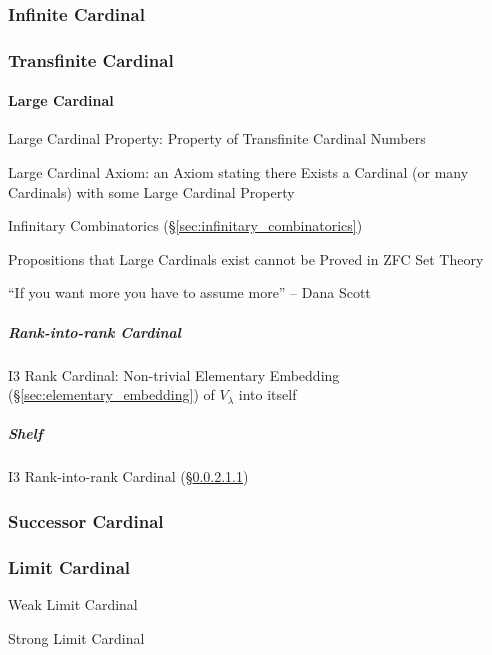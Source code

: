 \subsubsection{Infinite Cardinal}\label{sec:infinite_cardinal}

\subsubsection{Transfinite Cardinal}\label{sec:transfinite_cardinal}

\paragraph{Large Cardinal}\label{sec:large_cardinal}\hfill

Large Cardinal Property: Property of Transfinite Cardinal Numbers

Large Cardinal Axiom: an Axiom stating there Exists a Cardinal (or
many Cardinals) with some Large Cardinal Property

Infinitary Combinatorics (\S\ref{sec:infinitary_combinatorics})

Propositions that Large Cardinals exist cannot be Proved in ZFC Set
Theory

``If you want more you have to assume more'' -- Dana Scott



\subparagraph{Rank-into-rank Cardinal}\label{sec:rank_into_rank}\hfill

I3 Rank Cardinal: Non-trivial Elementary Embedding
(\S\ref{sec:elementary_embedding}) of $V_\lambda$ into itself



\subparagraph{Shelf}\label{sec:shelf}

I3 Rank-into-rank Cardinal (\S\ref{sec:rank_into_rank})



\subsubsection{Successor Cardinal}\label{sec:successor_cardinal}



\subsubsection{Limit Cardinal}\label{sec:limit_cardinal}

Weak Limit Cardinal

Strong Limit Cardinal



